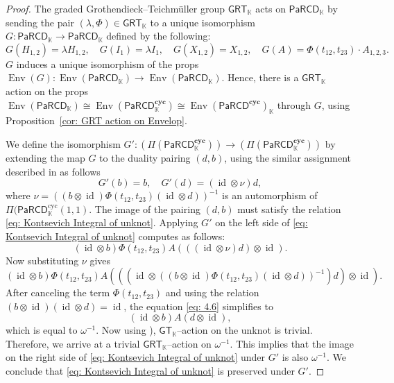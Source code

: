 \documentclass{amsart}
\newcommand{\kk}{\mathbb{K}}    %
\newcommand{\PaRCD}{\mathsf{PaRCD}}
\newcommand{\hPaRCD}{{\PaRCD}_{\kk}}
\newcommand{\cyc}{\mathbf{cyc}}
\newcommand{\id}{\operatorname{id}}
\newcommand{\Env}{\operatorname{Env}}
\newcommand{\lrar}{\ensuremath{\longrightarrow}}
\newcommand{\GT}{{\mathsf{GT}}}
\newcommand{\GRT}{{\mathsf{GRT}}}
\theoremstyle{definition}
\numberwithin{equation}{section}
\begin{document}
\begin{proof}
The graded Grothendieck--Teichmüller group $\GRT_{\kk}$ acts on $\hPaRCD$ by sending the pair $(\lambda, \Phi) \in \GRT_{\kk} $ to a unique isomorphism $G: \hPaRCD \rightarrow \hPaRCD$ defined by the following: 
\[G(H_{1,2}) = \lambda H_{1,2}, \quad G(I_1) = \lambda I_1,\quad G(X_{1,2}) = X_{1,2}, \quad G(A) = \Phi(t_{12}, t_{23}) \cdot A_{1,2,3}. \] 
$G$ induces a unique isomorphism of the props $\Env(G): \Env(\hPaRCD) \lrar \Env(\hPaRCD)$. Hence, there is a $\GRT_{\kk}$ action on the props $\Env(\hPaRCD) \cong \Env(\hPaRCD^{\cyc}) \cong {\Env(\PaRCD^{\cyc})}_{\kk}$ through $G$, using Proposition~\ref{cor: GRT action on Envelop}. 

We define the isomorphism $G': {(\Pi(\hPaRCD^{\cyc}))} \lrar {(\Pi(\hPaRCD^{\cyc}))}$ by extending the map $G$ to the duality pairing $(d,b)$, using the similar assignment described in \cite[Proposition~6.10]{RS2025cyclicgt} as follows \[G'(b) = b , \quad G'(d) = (\id \otimes \nu) d,\]
where $ \nu = \left( (b \otimes \id) \Phi(t_{12},t_{23})(\id \otimes d) \right)^{-1}$ is an automorphism of $\Pi(\hPaRCD^{\mathrm{cyc}}(1,1)$. 
The image of the pairing $(d,b)$ must satisfy the relation \eqref{eq: Kontsevich Integral of unknot}. Applying $G'$ on the left side of \eqref{eq: Kontsevich Integral of unknot} computes as follows: \[(\id \otimes b) \Phi(t_{12},t_{23}) A (((\id \otimes \nu) d )\otimes \id).\]
Now substituting $\nu$ gives 
\begin{equation}\label{eq: 4.6}
(\id \otimes b) \Phi(t_{12},t_{23}) A (((\id \otimes \left( (b \otimes \id) \Phi(t_{12},t_{23})(\id \otimes d) \right)^{-1}) d )\otimes \id).    
\end{equation}
After canceling the term $\Phi(t_{12},t_{23})$ and using the relation $(b \otimes \id) (\id \otimes d) = \id$, the equation \eqref{eq: 4.6} simplifies to \[(\id \otimes b) A (d \otimes \id),\] which is equal to $\omega^{-1}$. Now using \cite[Theorem A]{furusho_galois_2020}), $\GT_{\kk}$--action on the unknot is trivial. Therefore, we arrive at a trivial $\GRT_{\kk}$--action on $\omega^{-1}$. This implies that the image on the right side of \eqref{eq: Kontsevich Integral of unknot} under $G'$ is also $\omega^{-1}$. We conclude that \eqref{eq: Kontsevich Integral of unknot} is preserved under $G'$.

\end{proof}
\end{document}
